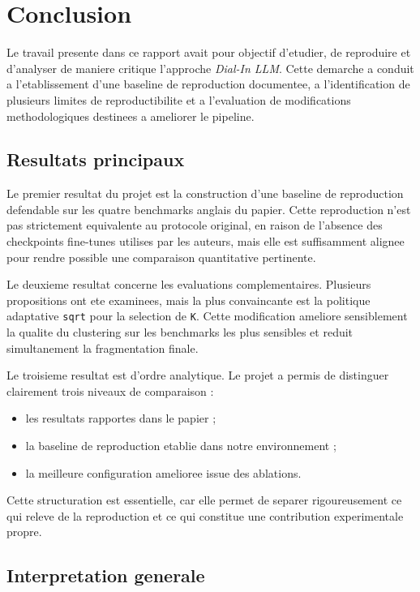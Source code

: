 \chapter{Conclusion}

Le travail presente dans ce rapport avait pour objectif d'etudier, de
reproduire et d'analyser de maniere critique l'approche \emph{Dial-In LLM}.
Cette demarche a conduit a l'etablissement d'une baseline de reproduction
documentee, a l'identification de plusieurs limites de reproductibilite et a
l'evaluation de modifications methodologiques destinees a ameliorer le
pipeline.

\section{Resultats principaux}

Le premier resultat du projet est la construction d'une baseline de
reproduction defendable sur les quatre benchmarks anglais du papier. Cette
reproduction n'est pas strictement equivalente au protocole original, en raison
de l'absence des checkpoints fine-tunes utilises par les auteurs, mais elle est
suffisamment alignee pour rendre possible une comparaison quantitative
pertinente.

Le deuxieme resultat concerne les evaluations complementaires. Plusieurs
propositions ont ete examinees, mais la plus convaincante est la politique
adaptative \texttt{sqrt} pour la selection de \texttt{K}. Cette modification
ameliore sensiblement la qualite du clustering sur les benchmarks les plus
sensibles et reduit simultanement la fragmentation finale.

Le troisieme resultat est d'ordre analytique. Le projet a permis de distinguer
clairement trois niveaux de comparaison :
\begin{itemize}[leftmargin=*]
  \item les resultats rapportes dans le papier ;
  \item la baseline de reproduction etablie dans notre environnement ;
  \item la meilleure configuration amelioree issue des ablations.
\end{itemize}

Cette structuration est essentielle, car elle permet de separer rigoureusement
ce qui releve de la reproduction et ce qui constitue une contribution
experimentale propre.

\section{Interpretation generale}

